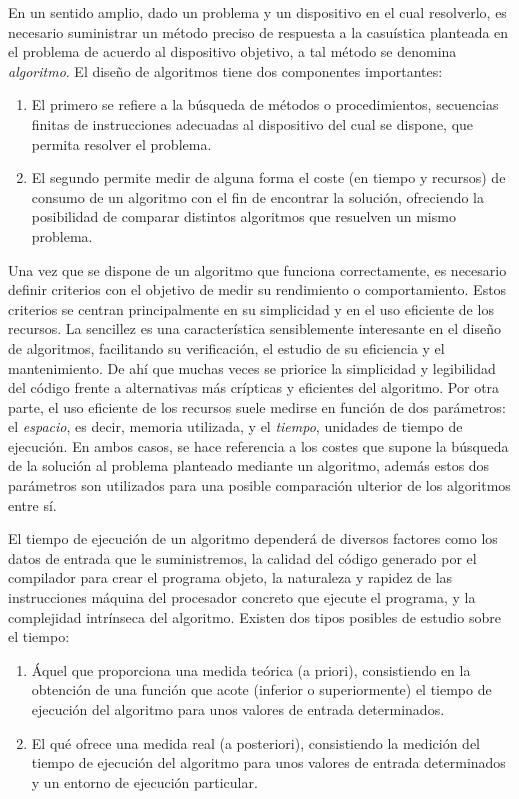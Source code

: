 En un sentido amplio, dado un problema y un dispositivo en el cual resolverlo, es necesario suministrar un método preciso de respuesta a la casuística 
planteada en el problema de acuerdo al dispositivo objetivo, a tal método se denomina \textit{algoritmo}. El diseño de algoritmos\cite{Vallecillo} 
tiene dos componentes importantes:

\begin{enumerate}
  \item El primero se refiere a la búsqueda de métodos o procedimientos, secuencias
finitas de instrucciones adecuadas al dispositivo del cual se dispone, que permita resolver el problema.  
\item  El segundo permite medir de alguna forma el coste (en tiempo y recursos) de consumo de un algoritmo con el fin de encontrar la
solución, ofreciendo la posibilidad de comparar distintos algoritmos que resuelven un mismo problema.
\end{enumerate}

Una vez que se dispone de un algoritmo que funciona correctamente, es necesario
definir criterios con el objetivo de medir su rendimiento o comportamiento. Estos criterios se centran principalmente en su 
simplicidad y en el uso eficiente de los recursos. La sencillez es una característica sensiblemente interesante en el diseño 
de algoritmos, facilitando su verificación, el estudio de su eficiencia y el mantenimiento. De ahí que muchas veces se priorice la simplicidad y legibilidad 
del código frente a alternativas más crípticas y eficientes del algoritmo. Por otra parte, el uso eficiente de los recursos suele medirse en función de dos
parámetros: el \textit{espacio}, es decir, memoria utilizada, y el \textit{tiempo}, unidades de tiempo de ejecución. En ambos casos, 
se hace referencia a los costes que supone la búsqueda de la solución al problema planteado mediante un algoritmo, además estos dos parámetros 
son utilizados para una posible comparación ulterior de los algoritmos entre sí.

El tiempo de ejecución de un algoritmo dependerá de diversos factores como los datos de entrada que le suministremos, la calidad del código
generado por el compilador para crear el programa objeto, la naturaleza y rapidez de las instrucciones máquina del procesador concreto que ejecute el programa, y la
complejidad intrínseca del algoritmo.  Existen dos tipos posibles de estudio sobre el tiempo:

\begin{enumerate}
\item  Áquel que proporciona una medida teórica (a priori), consistiendo en la obtención de una función que acote 
(inferior o superiormente) el tiempo de ejecución del algoritmo para unos valores de entrada determinados.
\item  El qué ofrece una medida real (a posteriori), consistiendo la medición del tiempo de ejecución del algoritmo para unos valores de entrada determinados 
y un entorno de ejecución particular.
\end{enumerate}

